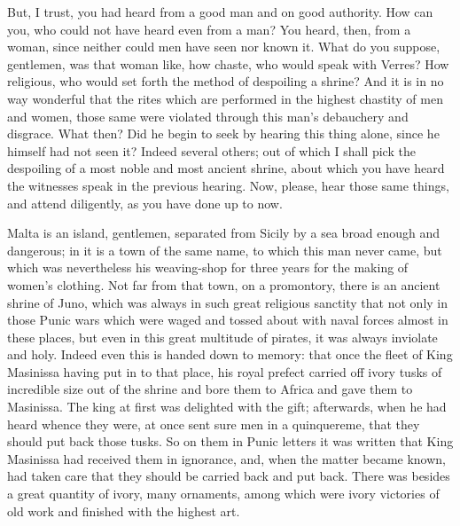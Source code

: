  But, I trust, you had heard from a good man and on good authority. How can you, who could not have heard even from a man? You heard, then, from a woman, since neither could men have seen nor known it. What do you suppose, gentlemen, was that woman like, how chaste, who would speak with Verres? How religious, who would set forth the method of despoiling a shrine? And it is in no way wonderful that the rites which are performed in the highest chastity of men and women, those same were violated through this man's debauchery and disgrace. What then? Did he begin to seek by hearing this thing alone, since he himself had not seen it? Indeed several others; out of which I shall pick the despoiling of a most noble and most ancient shrine, about which you have heard the witnesses speak in the previous hearing. Now, please, hear those same things, and attend diligently, as you have done up to now.

 Malta is an island, gentlemen, separated from Sicily by a sea broad enough and dangerous; in it is a town of the same name, to which this man never came, but which was nevertheless his weaving-shop for three years for the making of women's clothing. Not far from that town, on a promontory, there is an ancient shrine of Juno, which was always in such great religious sanctity that not only in those Punic wars which were waged and tossed about with naval forces almost in these places, but even in this great multitude of pirates, it was always inviolate and holy. Indeed even this is handed down to memory: that once the fleet of King Masinissa having put in to that place, his royal prefect carried off ivory tusks of incredible size out of the shrine and bore them to Africa and gave them to Masinissa. The king at first was delighted with the gift; afterwards, when he had heard whence they were, at once sent sure men in a quinquereme, that they should put back those tusks. So on them in Punic letters it was written that King Masinissa had received them in ignorance, and, when the matter became known, had taken care that they should be carried back and put back. There was besides a great quantity of ivory, many ornaments, among which were ivory victories of old work and finished with the highest art.

